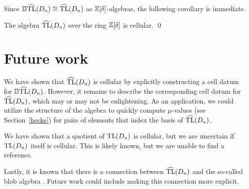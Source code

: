 Since $\operatorname{\mathbb{D}\widehat{TL}}(D_n)\cong\operatorname{\widehat{TL}}(D_n)$ as $\mathbb{Z}[\delta]$-algebras, the following corollary is immediate.

\begin{corollary}\label{pairfreecellular}
The algebra $\operatorname{\widehat{TL}}(D_n)$ over the ring $\mathbb{Z}[\delta]$ is cellular.
\qed
\end{corollary}

\section{Future work}

We have shown that $\operatorname{\widehat{TL}}(D_n)$ is cellular by explicitly constructing a cell datum for $\operatorname{\mathbb{D}\widehat{TL}}(D_n)$. However, it remains to describe the corresponding cell datum for $\operatorname{\widehat{TL}}(D_n)$, which may or may not be enlightening.  As an application, we could utilize the structure of the algebra to quickly compute $\mu$-values (see Section~\ref{hecke}) for pairs of elements that index the basis of $\operatorname{\widehat{TL}}(D_n)$. 

We have shown that a quotient of $\operatorname{TL}(D_n)$ is cellular, but we are uncertain if $\operatorname{TL}(D_n)$ itself is cellular. This is likely known, but we are unable to find a reference.

Lastly, it is known that there is a connection between $\operatorname{\widehat{TL}}(D_n)$ and the so-called blob algebra \cite{Martin1994}. Future work could include making this connection more explicit.

